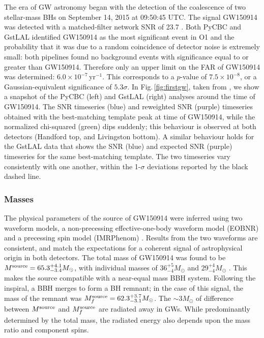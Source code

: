 \documentclass[binding=0.6cm, LaM]{sapthesis}
\begin{document}
	The era of GW astronomy began with the detection of the coalescence of two stellar-mass BHs
	on September 14, 2015 at 09:50:45 UTC.  
	The signal GW150914 was detected with a matched-filter network SNR of 23.7 \cite{21}. 
	Both {\ttfamily PyCBC} and {\ttfamily GstLAL} identified GW150914 as the most significant event in O1 and the probability that 
	it was due to a random coincidence of detector noise is extremely small: 
	both pipelines found no background events with significance 
	equal to or greater than GW150914.  
	Therefore only an upper limit on the FAR of GW150914 was determined: $6.0 \times 10^{-7}\,$yr$^{-1}$. 
	This corresponds to a $p$-value of $7.5\times10^{-8}$, or a Gaussian-equivalent significance of $5.3\sigma$.  
	In Fig.\,\ref{fig:firstgw}, taken from \cite{21}, we show a snapshot of the {\ttfamily PyCBC} (left) 
	and {\ttfamily GstLAL} (right) analyses around the time of GW150914.  
	The SNR timeseries (blue) and reweighted SNR (purple) timeseries 
	obtained with the best-matching template peak at time of GW150914, 	
	while the normalized chi-squared (green) dips suddenly; 
	this behaviour is observed at both detectors (Handford top, and Livingston bottom).  
	A similar behaviour holds for the {\ttfamily GstLAL} data that shows the SNR (blue) and expected SNR (purple) timeseries 
	for the same best-matching template.  
	The two timeseries vary consistently with one another, 
	within the 1-$\sigma$ deviations reported by the black dashed line.

	\subsubsection{Masses}
	The physical parameters of the source of GW150914 were inferred using two waveform models, 
	a non-precessing effective-one-body waveform model (EOBNR) \cite{103, 104} 
	and a precessing spin model (IMRPhenom) \cite{105-107}. 
	Results from the two waveforms are consistent, and match the expectations 
	for a coherent signal of astrophysical origin in both detectors. 
	The total mass of GW150914 was found to be $M^{\rm source} = 65.3^{+4.1}_{-3.4}M_\odot$, 
	with individual masses of $36^{+5}_{-4}M_\odot$ and $29^{+4}_{-4}M_\odot$ \cite{21,41,51}.  
	This makes the source compatible with a near-equal mass BBH system.
	Following the inspiral, a BBH merges to form a BH remnant; in the case of this signal, 
	the mass of the remnant was $M^{\rm source}_f = 62.3^{+3.7}_{-3.1}M_\odot$.
	The $\sim 3M_\odot$ of difference between $M^{\rm source}$ and $M^{\rm source}_f$ are radiated away in GWs.  
	While predominantly determined by the total mass, 
	the radiated energy also depends upon the mass ratio and component spins.
\end{document}
